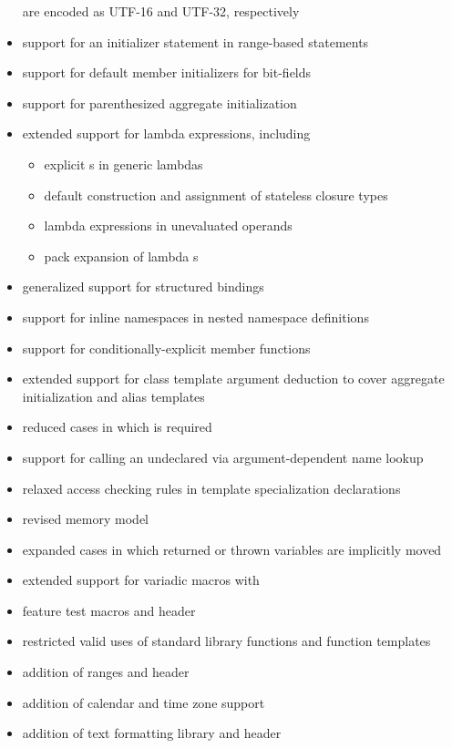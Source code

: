 \begin{itemize}
are encoded as UTF-16 and UTF-32, respectively
\item support for an initializer statement in range-based  statements
\item support for default member initializers for bit-fields
\item support for parenthesized aggregate initialization
\item extended support for lambda expressions, including
\begin{itemize}
  \item explicit s in generic lambdas
  \item default construction and assignment of stateless closure types
  \item lambda expressions in unevaluated operands
  \item pack expansion of lambda s
\end{itemize}
\item generalized support for structured bindings
\item support for inline namespaces in nested namespace definitions
\item support for conditionally-explicit member functions
\item extended support for class template argument deduction to cover
aggregate initialization and alias templates
\item reduced cases in which  is required
\item support for calling an undeclared 
via argument-dependent name lookup
\item relaxed access checking rules in template specialization declarations
\item revised memory model
\item expanded cases in which returned or thrown variables are implicitly moved
\item extended support for variadic macros with 
\item feature test macros and  header
\item restricted valid uses of standard library functions and function templates
\item addition of ranges and  header
\item addition of calendar and time zone support
\item addition of text formatting library and  header

\end{itemize}
